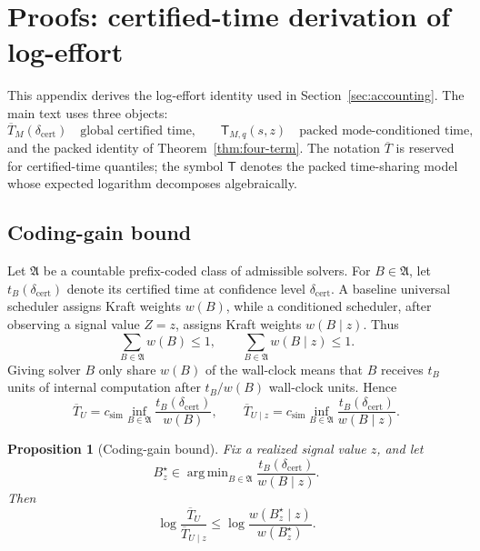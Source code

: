 \documentclass{article}
\newtheorem{proposition}{Proposition}
\DeclareMathOperator*{\argmin}{arg\,min}
\begin{document}
\clearpage



\clearpage

\appendix



\clearpage
\section{Proofs: certified-time derivation of log-effort}
\label{app:proofs}
\label{app:certified-log-effort}

This appendix derives the log-effort identity used in Section~\ref{sec:accounting}.
The main text uses three objects:
\[
    \overline T_M(\delta_{\mathrm{cert}})
    \quad\text{global certified time,}
    \qquad
    \mathsf T_{M,q}(s,z)
    \quad\text{packed mode-conditioned time,}
\]
and the packed identity of Theorem~\ref{thm:four-term}.
The notation \(\overline T\) is reserved for certified-time quantiles; the symbol
\(\mathsf T\) denotes the packed time-sharing model whose expected logarithm decomposes
algebraically.

\subsection{Coding-gain bound}

Let \(\mathfrak A\) be a countable prefix-coded class of admissible solvers.  For
\(B\in\mathfrak A\), let \(t_B(\delta_{\mathrm{cert}})\) denote its certified time at
confidence level \(\delta_{\mathrm{cert}}\).  A baseline universal scheduler assigns Kraft
weights \(w(B)\), while a conditioned scheduler, after observing a signal value \(Z=z\),
assigns Kraft weights \(w(B\mid z)\).  Thus
\[
    \sum_{B\in\mathfrak A}w(B)\le 1,
    \qquad
    \sum_{B\in\mathfrak A}w(B\mid z)\le 1.
\]
Giving solver \(B\) only share \(w(B)\) of the wall-clock means that \(B\) receives
\(t_B\) units of internal computation after \(t_B/w(B)\) wall-clock units.  Hence
\[
    \overline T_U
    =
    c_{\mathrm{sim}}
    \inf_{B\in\mathfrak A}
    \frac{t_B(\delta_{\mathrm{cert}})}{w(B)},
    \qquad
    \overline T_{U\mid z}
    =
    c_{\mathrm{sim}}
    \inf_{B\in\mathfrak A}
    \frac{t_B(\delta_{\mathrm{cert}})}{w(B\mid z)}.
\]

\begin{proposition}[Coding-gain bound]
\label{prop:app-coding-gain}
Fix a realized signal value \(z\), and let
\[
    B_z^\star
    \in
    \argmin_{B\in\mathfrak A}
    \frac{t_B(\delta_{\mathrm{cert}})}{w(B\mid z)}.
\]
Then
\[
    \log\frac{\overline T_U}{\overline T_{U\mid z}}
    \le
    \log\frac{w(B_z^\star\mid z)}{w(B_z^\star)}.
\]
\end{proposition}
\end{document}
